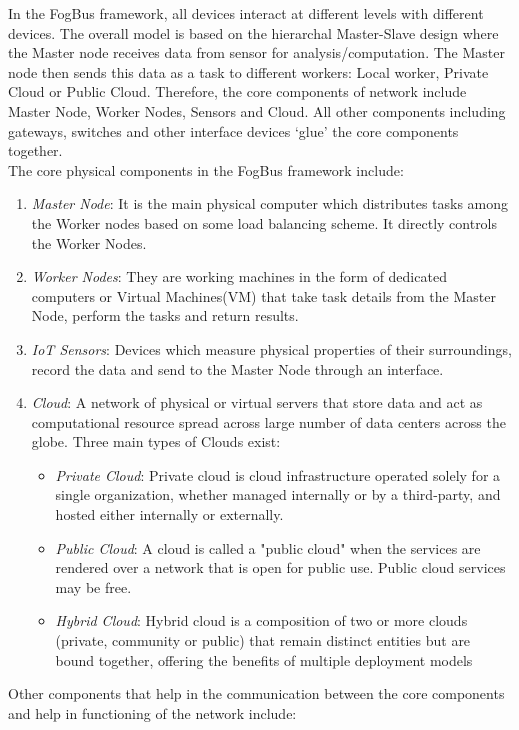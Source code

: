 \documentclass[10pt,journal,compsoc]{IEEEtran}
\begin{document}
In the FogBus framework, all devices interact at different levels with different devices. The overall model is based on the hierarchal Master-Slave design where the Master node receives data from sensor for analysis/computation. The Master node then sends this data as a task to different workers: Local worker, Private Cloud or Public Cloud. Therefore, the core components of network include Master Node, Worker Nodes, Sensors and Cloud. All other components including gateways, switches and other interface devices ‘glue’ the core components together.\\
The core physical components in the FogBus framework include:
\begin{enumerate}
\item \textit{Master Node}: It is the main physical computer which distributes tasks among the Worker nodes based on some load balancing scheme. It directly controls the Worker Nodes.
\item \textit{Worker Nodes}: They are working machines in the form of dedicated computers or Virtual Machines(VM) that take task details from the Master Node, perform the tasks and return results. 
\item \textit{IoT Sensors}: Devices which measure physical properties of their surroundings, record the data and send to the Master Node through an interface. 
\item \textit{Cloud}: A network of physical or virtual servers that store data and act as computational resource spread across large number of data centers across the globe. Three main types of Clouds exist:
\begin{itemize}
\item \textit{Private Cloud}: Private cloud is cloud infrastructure operated solely for a single organization, whether managed internally or by a third-party, and hosted either internally or externally.
\item \textit{Public Cloud}: A cloud is called a "public cloud" when the services are rendered over a network that is open for public use. Public cloud services may be free.
\item \textit{Hybrid Cloud}: Hybrid cloud is a composition of two or more clouds (private, community or public) that remain distinct entities but are bound together, offering the benefits of multiple deployment models
\end{itemize}
\end{enumerate}
Other components that help in the communication between the core components and help in functioning of the network include:
\end{document}
